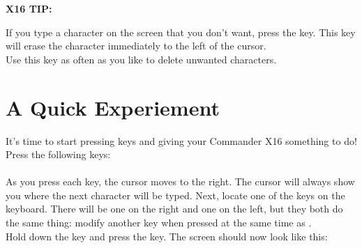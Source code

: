 

\begin{tcolorbox}[
		colback=white,
		colframe=blue,
		width=4.25in,
		height=2.1in,
		]


		{\sffamily\bfseries\fontsize{16pt}{16pt}\selectfont X16 TIP:\\}

		If you type a character on the screen that you don't want, press the
		 key.  This key will erase the character immediately
		to the left of the cursor.\\

		Use this key as often as you like to delete unwanted characters.

\end{tcolorbox}

\section{A Quick Experiement}


It's time to start pressing keys and giving your Commander X16 something to do!
Press the following keys:\\

    \\



As you press each key, the cursor moves to the right.  The cursor will always
show you where the next character will be typed.  Next, locate one of the
 keys on the keyboard.  There will be
one on the right and one on the left, but they both do the same thing: modify another
key when pressed at the same time as .\\

Hold down the  key and press the
 key.  The screen should now look
like this:\\

